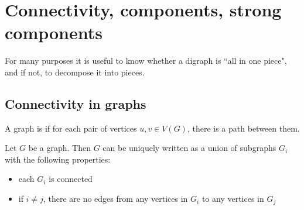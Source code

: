 \chapter{Connectivity, components, strong components}

For many purposes it is useful to know whether a digraph is ``all in one
piece", and if not, to decompose it into pieces.

\section{Connectivity in graphs}


\begin{Definition} 
A graph is  if for each pair of 
vertices $u, v\in V(G)$, there is a path between them.
\end{Definition}



\begin{Theorem}
\label{thm:components}
Let $G$ be a graph. Then $G$ can be uniquely written as a union of
subgraphs $G_i$ with the following properties:
\begin{itemize}
\item each $G_i$ is connected
\item if $i\neq j$, there are no edges from any vertices in $G_i$ 
to any vertices in $G_j$
\end{itemize}
\end{Theorem}


